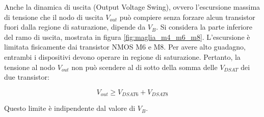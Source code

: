 \documentclass[12pt,a4paper,twoside]{report}
\begin{document}
\vspace{0.3cm}

\noindent Anche la dinamica di uscita (Output Voltage Swing), ovvero l'escursione massima di tensione che il nodo di uscita $V_{out}$ può compiere senza forzare alcun transistor fuori dalla regione di saturazione, dipende da $V_B$. Si considera la parte inferiore del ramo di uscita, mostrata in figura \ref{fig:maglia_m4_m6_m8}. L'escursione è limitata fisicamente dai transistor NMOS M6 e M8. Per avere alto guadagno, entrambi i dispositivi devono operare in regione di saturazione. Pertanto, la tensione al nodo $V_{out}$ non può scendere al di sotto della somma delle $V_{DSAT}$ dei due transistor:

$$V_{out} \ge V_{DSAT6} + V_{DSAT8}$$

\vspace{0.3cm}
\noindent Questo limite è indipendente dal valore di $V_B$.
\end{document}
